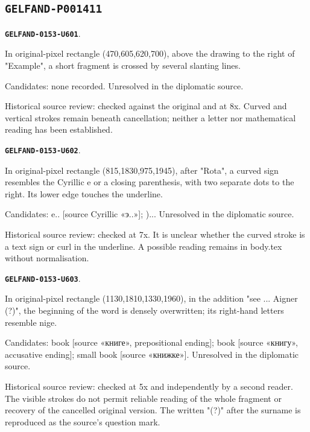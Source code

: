 \documentclass[11pt]{article}
\theoremstyle{definition}
\theoremstyle{remark}
\begin{document}
\subsection*{\texttt{GELFAND-P001411}}
\par\noindent\leavevmode{}\label{GELFAND-0153-U601}\label{GELFAND-P001411:example-cancelled:note}\textbf{\texttt{GELFAND-0153-U601}}.\nopagebreak[4]\par
In original-pixel rectangle (470,605,620,700), above the drawing to the right of "Example", a short fragment is crossed by several slanting lines.\par
Candidates: none recorded. Unresolved in the diplomatic source.\par
Historical source review: checked against the original and at 8x. Curved and vertical strokes remain beneath cancellation; neither a letter nor mathematical reading has been established.\par\medskip
\par\noindent\leavevmode{}\label{GELFAND-0153-U602}\label{GELFAND-P001411:book-after-rota:note}\textbf{\texttt{GELFAND-0153-U602}}.\nopagebreak[4]\par
In original-pixel rectangle (815,1830,975,1945), after "Rota", a curved sign resembles the Cyrillic e or a closing parenthesis, with two separate dots to the right. Its lower edge touches the underline.\par
Candidates: e.. [source Cyrillic «э..»]; )... Unresolved in the diplomatic source.\par
Historical source review: checked at 7x. It is unclear whether the curved stroke is a text sign or curl in the underline. A possible reading remains in body.tex without normalisation.\par\medskip
\par\noindent\leavevmode{}\label{GELFAND-0153-U603}\label{GELFAND-P001411:book-overwritten-noun:note}\textbf{\texttt{GELFAND-0153-U603}}.\nopagebreak[4]\par
In original-pixel rectangle (1130,1810,1330,1960), in the addition "see ... Aigner (?)", the beginning of the word is densely overwritten; its right-hand letters resemble nige.\par
Candidates: book [source «книге», prepositional ending]; book [source «книгу», accusative ending]; small book [source «книжке»]. Unresolved in the diplomatic source.\par
Historical source review: checked at 5x and independently by a second reader. The visible strokes do not permit reliable reading of the whole fragment or recovery of the cancelled original version. The written "(?)" after the surname is reproduced as the source's question mark.\par\medskip
\end{document}
